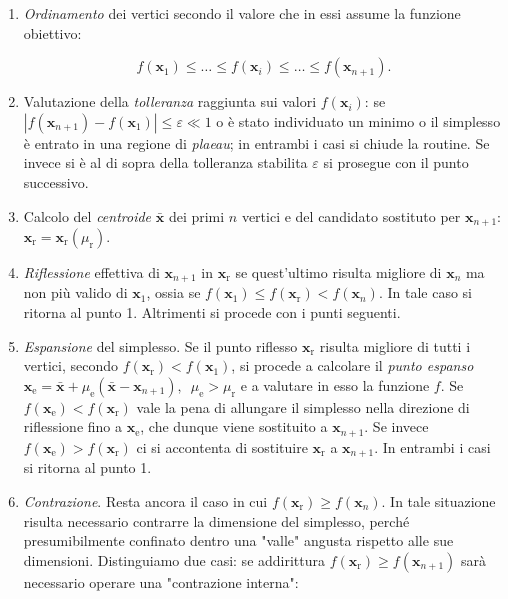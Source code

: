 \begin{enumerate}
	\item \emph{Ordinamento}  dei vertici secondo il valore che in essi assume la funzione obiettivo:
	
	\begin{equation*}
	f(\mathbf{x}_1) \leq \dots \leq f(\mathbf{x}_i)  \leq \dots \leq f(\mathbf{x}_{n+1}).
	\end{equation*}
	
	\item Valutazione della \emph{tolleranza} raggiunta sui valori $f(\mathbf{x}_i)$: se $\left|f(\mathbf{x}_{n+1}) - f(\mathbf{x}_1)\right| \leq \varepsilon \ll 1$ o è stato individuato un minimo o il simplesso è entrato in una regione di \emph{plaeau}; in entrambi i casi si chiude la routine. Se invece si è al di sopra della tolleranza stabilita $\varepsilon$ si prosegue con il punto successivo.
	
	\item Calcolo del \emph{centroide} $\bar{\mathbf{x}}$ dei primi $n$ vertici	e del candidato sostituto per $\mathbf{x}_{n+1}$: $\mathbf{x}_\mathrm{r} = \mathbf{x}_\mathrm{r}(\mu_\mathrm{r})$.
	
	\item \emph{Riflessione} effettiva di $\mathbf{x}_{n+1}$ in $\mathbf{x}_\mathrm{r}$ se quest'ultimo risulta migliore di  $\mathbf{x}_{n}$ ma non più valido di $\mathbf{x}_{1}$, ossia se $f(\mathbf{x}_1) \leq f(\mathbf{x}_\mathrm{r}) < f(\mathbf{x}_n)$. In tale caso si ritorna al punto 1. Altrimenti si procede con i punti seguenti.
	
	\item \emph{Espansione} del simplesso. Se il punto riflesso $\mathbf{x}_\mathrm{r}$ risulta migliore di tutti i vertici, secondo $f(\mathbf{x}_\mathrm{r}) < f(\mathbf{x}_1)$, si procede a calcolare il \emph{punto espanso} $\mathbf{x}_\mathrm{e}= \bar{\mathbf{x}} + \mu_\mathrm{e}(\bar{\mathbf{x}}-\mathbf{x}_{n+1}),\enspace \mu_\mathrm{e} > \mu_\mathrm{r}$ e a valutare in esso la funzione $f$. Se $f(\mathbf{x}_\mathrm{e}) < f(\mathbf{x}_\mathrm{r})$ vale la pena di allungare il simplesso nella direzione di riflessione fino a $\mathbf{x}_\mathrm{e}$, che dunque viene sostituito a $\mathbf{x}_{n+1}$. Se invece $f(\mathbf{x}_\mathrm{e}) > f(\mathbf{x}_\mathrm{r})$ ci si accontenta di sostituire $\mathbf{x}_\mathrm{r}$ a $\mathbf{x}_{n+1}$. In entrambi i casi si ritorna al punto 1.
	
	\item \emph{Contrazione}. Resta ancora il caso in cui $f(\mathbf{x}_\mathrm{r}) \geq f(\mathbf{x}_{n})$. In tale situazione risulta necessario contrarre la dimensione del simplesso, perché presumibilmente confinato dentro una "valle" angusta rispetto alle sue dimensioni. Distinguiamo due casi: se addirittura $f(\mathbf{x}_\mathrm{r}) \geq f(\mathbf{x}_{n+1})$ sarà necessario operare una "contrazione interna":
	

\end{enumerate}
